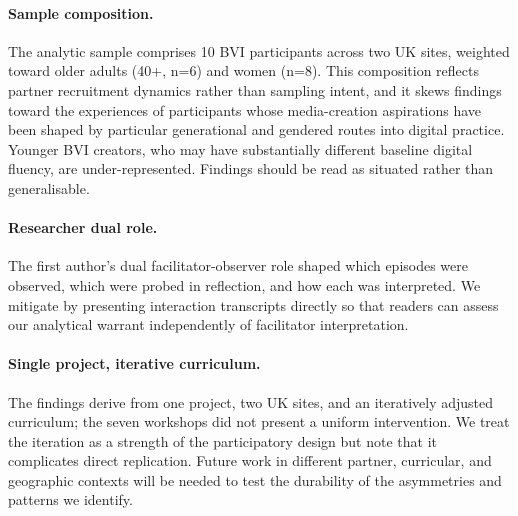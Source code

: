 \paragraph{Sample composition.}
The analytic sample comprises 10 BVI participants across two UK sites, weighted toward older adults (40+, n=6) and women (n=8). This composition reflects partner recruitment dynamics rather than sampling intent, and it skews findings toward the experiences of participants whose media-creation aspirations have been shaped by particular generational and gendered routes into digital practice. Younger BVI creators, who may have substantially different baseline digital fluency, are under-represented. Findings should be read as situated rather than generalisable.

\paragraph{Researcher dual role.}
The first author's dual facilitator-observer role shaped which episodes were observed, which were probed in reflection, and how each was interpreted. We mitigate by presenting interaction transcripts directly so that readers can assess our analytical warrant independently of facilitator interpretation.

\paragraph{Single project, iterative curriculum.}
The findings derive from one project, two UK sites, and an iteratively adjusted curriculum; the seven workshops did not present a uniform intervention. We treat the iteration as a strength of the participatory design but note that it complicates direct replication. Future work in different partner, curricular, and geographic contexts will be needed to test the durability of the asymmetries and patterns we identify.

